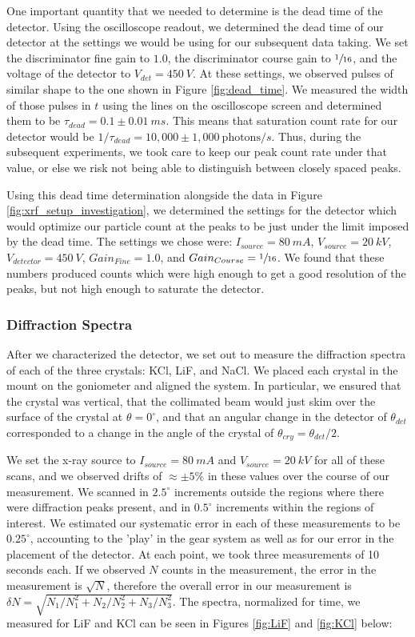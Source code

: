 \documentclass[%
 reprint,
 amsmath,amssymb,
 aps,
 pra,
]{revtex4-1}
\begin{document}
One important quantity that we needed to determine is the dead time of the detector. Using the oscilloscope readout, we determined the dead time of our detector at the settings we would be using for our subsequent data taking. We set the discriminator fine gain to $1.0$, the discriminator course gain to $\sfrac{1}{16}$, and the voltage of the detector to $V_{det} = 450~V$. At these settings, we observed pulses of similar shape to the one shown in Figure \ref{fig:dead_time}. We measured the width of those pulses in $t$ using the lines on the oscilloscope screen and determined them to be $\tau_{dead} = 0.1 \pm 0.01~ms$. This means that saturation count rate for our detector would be $1/\tau_{dead} = 10,000 \pm 1,000~\text{photons}/s$. Thus, during the subsequent experiments, we took care to keep our peak count rate under that value, or else we risk not being able to distinguish between closely spaced peaks.

Using this dead time determination alongside the data in Figure \ref{fig:xrf_setup_investigation}, we determined the settings for the detector which would optimize our particle count at the peaks to be just under the limit imposed by the dead time. The settings we chose were: $I_{source} = 80~mA$, $V_{source} = 20~kV$, $V_{detector} = 450~V$, $Gain_{Fine} = 1.0$, and $Gain_{Course} = \sfrac{1}{16}$. We found that these numbers produced counts which were high enough to get a good resolution of the peaks, but not high enough to saturate the detector.

\subsubsection{Diffraction Spectra}

After we characterized the detector, we set out to measure the diffraction spectra of each of the three crystals: KCl, LiF, and NaCl. We placed each crystal in the mount on the goniometer and aligned the system. In particular, we ensured that the crystal was vertical, that the collimated beam would just skim over the surface of the crystal at $\theta = 0^\circ$, and that an angular change in the detector of $\theta_{det}$ corresponded to a change in the angle of the crystal of $\theta_{cry} = \theta_{det}/2$. 

We set the x-ray source to $I_{source} = 80~mA$ and $V_{source} = 20~kV$ for all of these scans, and we observed drifts of $\approx \pm 5\%$ in these values over the course of our measurement. We scanned in $2.5^\circ$ increments outside the regions where there were diffraction peaks present, and in $0.5^\circ$ increments within the regions of interest. We estimated our systematic error in each of these measurements to be $0.25^\circ$, accounting to the 'play' in the gear system as well as for our error in the placement of the detector. At each point, we took three measurements of 10 seconds each. If we observed $N$ counts in the measurement, the error in the measurement is $\sqrt{N}$, therefore the overall error in our measurement is $\delta N =\sqrt{N_1/N_1^2 + N_2/N_2^2 + N_3/N_3^2}$. The spectra, normalized for time, we measured for LiF and KCl can be seen in Figures \ref{fig:LiF} and \ref{fig:KCl} below:
\end{document}
